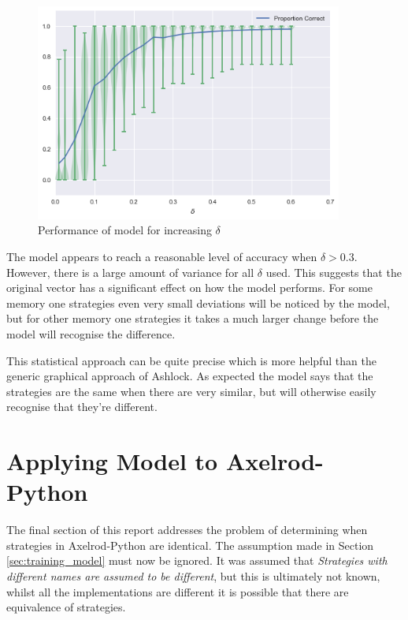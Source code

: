 \begin{figure}[htbp!]
    \centering
    \includegraphics[width=0.9\textwidth]{../img/ML/proportion-correct.png}
    \caption{Performance of model for increasing $\delta$}
    \label{fig:m1_correct}
\end{figure}

The model appears to reach a reasonable level of accuracy when $\delta > 0.3$.
However, there is a large amount of variance for all $\delta$ used.
This suggests that the original vector has a significant effect on how the model performs.
For some memory one strategies even very small deviations will be noticed by the model, but for other memory one strategies it takes a much larger change before the model will recognise the difference.

This statistical approach can be quite precise which is more helpful than the generic graphical approach of Ashlock.
As expected the model says that the strategies are the same when there are very similar, but will otherwise easily recognise that they're different.



\section{Applying Model to Axelrod-Python}

The final section of this report addresses the problem of determining when strategies in Axelrod-Python are identical.
The assumption made in Section \ref{sec:training_model} must now be ignored.
It was assumed that \textit{Strategies with different names are assumed to be different}, but this is ultimately not known, whilst all the implementations are different it is possible that there are equivalence of strategies.

